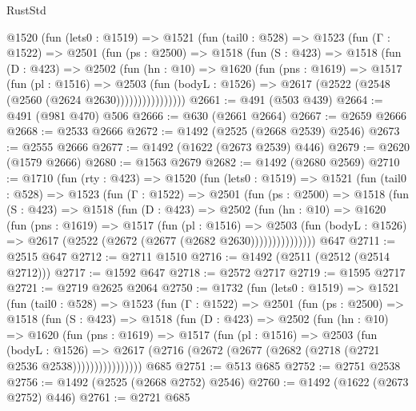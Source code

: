 \begin{lexlean}{RustStd}
\begin{coremodule}
{\begin{coremodule}
{{{{{{{{{{{{{      @1520
        (fun (lets0 : @1519) =>
        @1521
          (fun (tail0 : @528) =>
          @1523
            (fun (Γ : @1522) =>
            @2501
              (fun (ps : @2500) =>
              @1518
                (fun (S : @423) =>
                @1518
                  (fun (D : @423) =>
                  @2502
                    (fun (hn : @10) =>
                    @1620
                      (fun (pns : @1619) =>
                      @1517
                        (fun (pl : @1516) =>
                        @2503
                          (fun (bodyL : @1526) =>
                          @2617 (@2522 (@2548 (@2560 (@2624 @2630))))))))))))))))
@2661 := @491 (@503 @439)
@2664 := @491 (@981 @470) @506
@2666 := @630 (@2661 @2664)
@2667 := @2659 @2666
@2668 := @2533 @2666
@2672 := @1492 (@2525 (@2668 @2539) @2546)
@2673 := @2555 @2666
@2677 := @1492 (@1622 (@2673 @2539) @446)
@2679 := @2620 (@1579 @2666)
@2680 := @1563 @2679
@2682 := @1492 (@2680 @2569)
@2710 := @1710
    (fun (rty : @423) =>
    @1520
      (fun (lets0 : @1519) =>
      @1521
        (fun (tail0 : @528) =>
        @1523
          (fun (Γ : @1522) =>
          @2501
            (fun (ps : @2500) =>
            @1518
              (fun (S : @423) =>
              @1518
                (fun (D : @423) =>
                @2502
                  (fun (hn : @10) =>
                  @1620
                    (fun (pns : @1619) =>
                    @1517
                      (fun (pl : @1516) =>
                      @2503
                        (fun (bodyL : @1526) =>
                        @2617 (@2522 (@2672 (@2677 (@2682 @2630)))))))))))))))
    @647
@2711 := @2515 @647
@2712 := @2711 @1510
@2716 := @1492 (@2511 (@2512 (@2514 @2712)))
@2717 := @1592 @647
@2718 := @2572 @2717
@2719 := @1595 @2717
@2721 := @2719 @2625 @2064
@2750 := @1732
    (fun (lets0 : @1519) =>
    @1521
      (fun (tail0 : @528) =>
      @1523
        (fun (Γ : @1522) =>
        @2501
          (fun (ps : @2500) =>
          @1518
            (fun (S : @423) =>
            @1518
              (fun (D : @423) =>
              @2502
                (fun (hn : @10) =>
                @1620
                  (fun (pns : @1619) =>
                  @1517
                    (fun (pl : @1516) =>
                    @2503
                      (fun (bodyL : @1526) =>
                      @2617 (@2716 (@2672 (@2677 (@2682 (@2718 (@2721 @2536 @2538))))))))))))))))
    @685
@2751 := @513 @685
@2752 := @2751 @2538
@2756 := @1492 (@2525 (@2668 @2752) @2546)
@2760 := @1492 (@1622 (@2673 @2752) @446)
@2761 := @2721 @685
}}}}}}}}}}}}}
\end{coremodule}}
\end{coremodule}
\end{lexlean}
